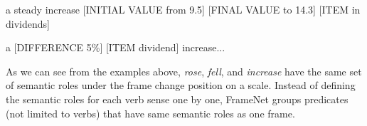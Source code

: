 a steady increase [INITIAL VALUE from 9.5] [FINAL VALUE to 14.3] [ITEM in dividends]

a [DIFFERENCE 5\%] [ITEM dividend] increase... 

As we can see from the examples above, \textit{rose}, \textit{fell}, and \textit{increase} have the same set of semantic roles under the frame change position on a scale. Instead of defining the semantic roles for each verb sense one by one, FrameNet groups predicates (not limited to verbs) that have same semantic roles as one frame.
%
%
%
%

